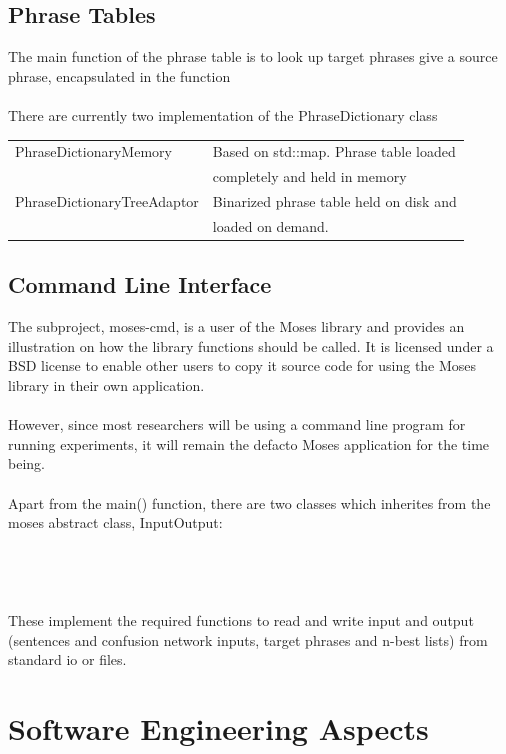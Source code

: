 \documentclass[10pt]{report}
\theoremstyle{plain}
\begin{document}
{\subsection{Phrase Tables}	
The main function of the phrase table is to look up target phrases give a source phrase, encapsulated in the function\\
\\
There are currently two implementation of the PhraseDictionary class\\
\begin{tabular}{|l|l|}
\hline
PhraseDictionaryMemory & Based on std::map. Phrase table loaded\\ 
 & completely and held in memory\\
PhraseDictionaryTreeAdaptor & Binarized phrase table held on disk and \\
 & loaded on demand.\\
\hline
\end{tabular}
\subsection{Command Line Interface}
The subproject, moses-cmd, is a user of the Moses library and provides an illustration on how the library functions should be called. It is licensed under a BSD license to enable other users to copy it source code for using the Moses library in their own application.\\
\\
However, since most researchers will be using a command line program for running experiments, it will remain the defacto Moses application for the time being.\\
\\
Apart from the main() function, there are two classes which inherites from the moses abstract class, InputOutput:\\
\\
\\
\\
\\
These implement the required functions to read and write input and output (sentences and confusion network inputs, target phrases and n-best lists) from standard io or files.





\section{Software Engineering Aspects}

}
\end{document}
